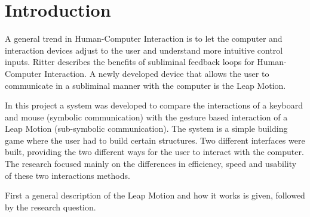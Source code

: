 \section{Introduction}
A general trend in Human-Computer Interaction is to let the computer and interaction devices adjust to the user and understand more intuitive control inputs. 
Ritter \cite{ritter2011benefits} describes the benefits of subliminal feedback loops for Human-Computer Interaction. 
A newly developed device that allows the user to communicate in a subliminal manner with the computer is the Leap Motion. 

In this project a system was developed to compare the interactions of a keyboard and mouse (symbolic communication) with the gesture based interaction of a Leap Motion 
(sub-symbolic communication). 
The system is a simple building game where the user had to build certain structures. Two different interfaces were built, providing the two different ways for the user to 
interact with the computer.
The research focused mainly on the differences in efficiency, speed and usability of these two interactions methods.

First a general description of the Leap Motion and how it works is given, followed by the research question.


